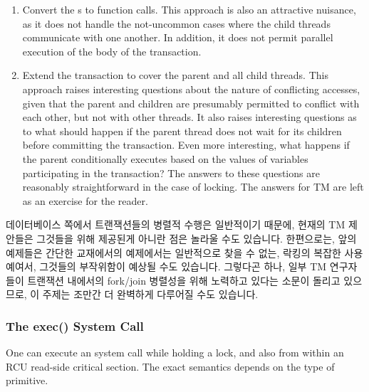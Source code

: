 \begin{enumerate}
\item	Convert the s to function calls.
	This approach is also an attractive nuisance, as it does not
	handle the not-uncommon cases where the child threads communicate
	with one another.
	In addition, it does not permit parallel execution of the body
	of the transaction.
\item	Extend the transaction to cover the parent and all child threads.
	This approach raises interesting questions about the nature of
	conflicting accesses, given that the parent and children are
	presumably permitted to conflict with each other, but not with
	other threads.
	It also raises interesting questions as to what should happen
	if the parent thread does not wait for its children before
	committing the transaction.
	Even more interesting, what happens if the parent conditionally
	executes  based on the values of variables
	participating in the transaction?
	The answers to these questions are reasonably straightforward
	in the case of locking.
	The answers for TM are left as an exercise for the reader.
\fi
\end{enumerate}

데이터베이스 쪽에서 트랜잭션들의 병렬적 수행은 일반적이기 때문에, 현재의 TM
제안들은 그것들을 위해 제공된게 아니란 점은 놀라울 수도 있습니다.
한편으로는, 앞의 예제들은 간단한 교재에서의 예제에서는 일반적으로 찾을 수 없는,
락킹의 복잡한 사용 예여서, 그것들의 부작위함이 예상될 수도 있습니다.
그렇다곤 하나, 일부 TM 연구자들이 트랜잭션 내에서의 fork/join 병렬성을 위해
노력하고 있다는 소문이 돌리고 있으므로, 이 주제는 조만간 더 완벽하게 다루어질
수도 있습니다.

\subsubsection{The exec() System Call}
\label{sec:future:The exec System Call}

One can execute an  system call while holding a lock, and
also from within an RCU read-side critical section.
The exact semantics depends on the type of primitive.

